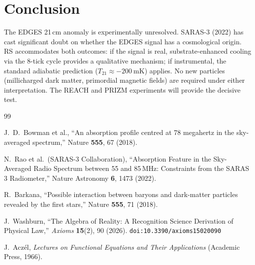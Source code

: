\documentclass[12pt,a4paper]{article}
\theoremstyle{definition}
\theoremstyle{remark}
\begin{document}
\section{Conclusion}
\label{sec:conclusion}

The EDGES 21\,cm anomaly is experimentally unresolved.  SARAS-3
(2022) has cast significant doubt on whether the EDGES signal has
a cosmological origin.  RS accommodates both outcomes: if the signal
is real, substrate-enhanced cooling via the 8-tick cycle provides a
qualitative mechanism; if instrumental, the standard adiabatic
prediction ($T_{21} \approx -200~\mathrm{mK}$) applies.  No new
particles (millicharged dark matter, primordial magnetic fields) are
required under either interpretation.  The REACH and PRIZM experiments
will provide the decisive test.

\begin{thebibliography}{99}

J.~D.~Bowman et al.,
``An absorption profile centred at 78 megahertz in the
sky-averaged spectrum,''
Nature \textbf{555}, 67 (2018).

N.~Rao et al.\ (SARAS-3 Collaboration),
``Absorption Feature in the Sky-Averaged Radio Spectrum between 55 and
85\,MHz: Constraints from the SARAS\,3 Radiometer,''
Nature Astronomy \textbf{6}, 1473 (2022).

R.~Barkana,
``Possible interaction between baryons and dark-matter particles
revealed by the first stars,''
Nature \textbf{555}, 71 (2018).

J.~Washburn, ``The Algebra of Reality: A Recognition Science Derivation
of Physical Law,'' \emph{Axioms} \textbf{15}(2), 90 (2026).
\texttt{doi:10.3390/axioms15020090}

J.~Acz\'el, \emph{Lectures on Functional Equations and Their
Applications} (Academic Press, 1966).

\end{thebibliography}
\end{document}
